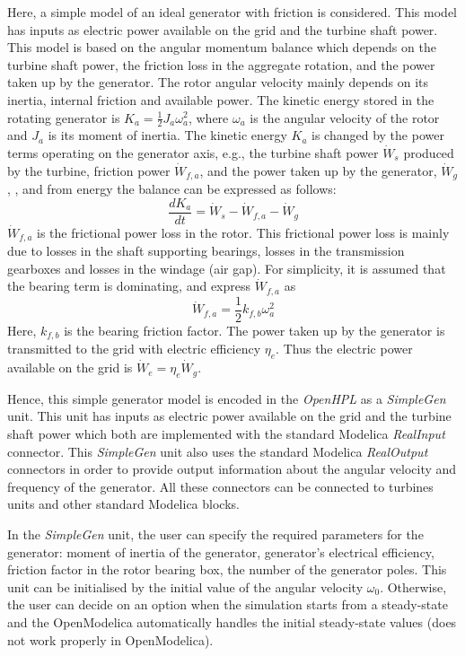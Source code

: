 \documentclass[%
]{USN-PhD}
\begin{document}
Here, a simple model of an ideal generator with friction is considered. This model has inputs as electric power available on the grid and the turbine shaft power. This model is based on the angular momentum balance which depends on the turbine shaft power, the friction loss in the aggregate rotation, and the power taken up by the generator. The rotor angular velocity mainly depends on its inertia, internal friction and available power. The kinetic energy stored in the rotating generator is $ K_a=\frac{1}{2}J_a\omega_a^2$, where $\omega_a$ is the angular velocity of the rotor and $J_a$ is its moment of inertia. The kinetic energy $K_a$ is changed by the power terms operating on the generator axis, e.g., the turbine shaft power $\dot{W}_s$ produced by the turbine, friction power $\dot{W}_{f,a}$, and the power taken up by the generator, $\dot{W}_g$, \cite{LieL:18}, and from energy the balance can be expressed as follows:
\begin{equation}
\frac{dK_a}{dt}=\dot{W}_s-\dot{W}_{f,a}-\dot{W}_g
\end{equation}
$\dot{W}_{f,a}$ is the frictional power loss in the rotor. This frictional power loss is mainly due to losses in the shaft supporting bearings, losses in the transmission gearboxes and losses in the windage (air gap). For simplicity, it is assumed that the bearing term is dominating, and express $\dot{W}_{f,a}$ as
\begin{equation}
\dot{W}_{f,a}=\frac{1}{2}k_{f,b}\omega_a^2
\end{equation}
Here, $k_{f,b}$ is the bearing friction factor. The power taken up by the generator is transmitted to the grid with electric efficiency $\eta_e$. Thus the electric power available on the grid is $\dot{W}_e=\eta_e\dot{W}_g$.

Hence, this simple generator model is encoded in the \emph{OpenHPL} as a \emph{SimpleGen} unit. This unit has inputs as electric power available on the grid and the turbine shaft power which both are implemented with the standard Modelica \emph{RealInput} connector. This \emph{SimpleGen} unit also uses the standard Modelica \emph{RealOutput} connectors in order to provide output information about the angular velocity and frequency of the generator. All these connectors can be connected to turbines units and other standard Modelica blocks.

In the \emph{SimpleGen} unit, the user can specify the required parameters for the generator: moment of inertia of the generator, generator's electrical efficiency, friction factor in the rotor bearing box, the number of the generator poles. This unit can be initialised by the initial value of the angular velocity $\omega_0$. Otherwise, the user can decide on an option when the simulation starts from a steady-state and the OpenModelica automatically handles the initial steady-state values (does not work properly in OpenModelica).
\end{document}
